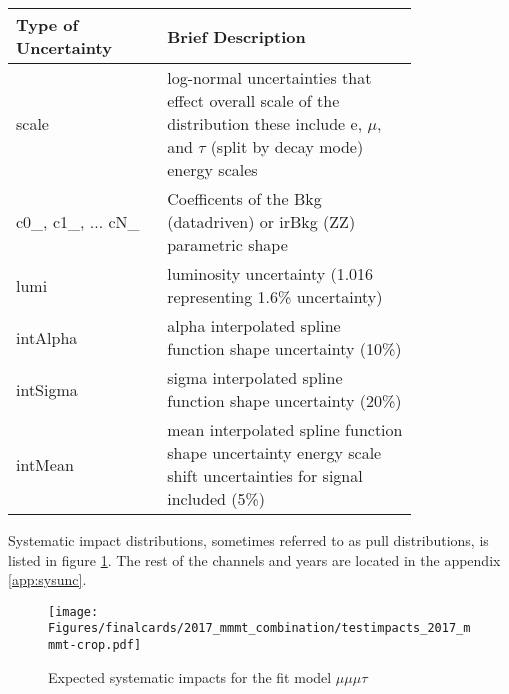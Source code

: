 \begin{table}[h!tb]
\centering
\topcaption{
\label{tab:impact_guide}
}
\begin{tabular}{|p{0.3\linewidth}|p{0.5\linewidth}|}
\hline  
Type of Uncertainty & Brief Description \\\hline
scale & log-normal uncertainties that effect overall scale of the distribution these include e, $\mu$, and $\tau$ (split by decay mode) energy scales  \\\hline
 c0\_, c1\_, ... cN\_& Coefficents of the Bkg (datadriven) or irBkg (ZZ) parametric shape \\\hline
lumi & luminosity uncertainty (1.016 representing 1.6\% uncertainty) \\\hline
intAlpha & alpha interpolated spline function shape uncertainty (10\%) \\\hline
intSigma & sigma interpolated spline function shape uncertainty (20\%) \\\hline
intMean & mean interpolated spline function shape uncertainty energy scale shift uncertainties for signal included (5\%) \\\hline
\end{tabular}
\end{table}
\clearpage 

Systematic impact distributions, sometimes referred to as pull distributions, is listed in figure \ref{fig:impacts_2017_mmmt}. The rest of the channels and years are located in the appendix \ref{app:sysunc}.

\begin{figure}[ht!b]
    \centering 
\texttt{[image: Figures/finalcards/2017\_mmmt\_combination/testimpacts\_2017\_mmmt-crop.pdf]}
    \caption{\label{fig:impacts_2017_mmmt} Expected systematic impacts for the fit model $\mu\mu\mu\tau$}
\end{figure}




